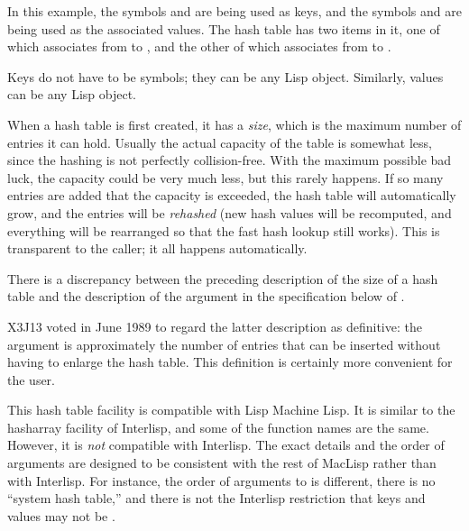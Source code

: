 In this example, the symbols  and  are being used as
keys, and the symbols  and  are being used as the
associated values.  The hash table has two items in it, one of which
associates from  to , and the other of which
associates from  to .

Keys do not have to be symbols; they can be any Lisp object.  Similarly,
values can be any Lisp object.

\begin{obsolete}
When a hash table is first created, it has a {\it size}, which is the
maximum number of entries it can hold.  Usually the actual capacity of
the table is somewhat less, since the hashing is not perfectly
collision-free.  With the maximum possible bad luck, the capacity could
be very much less, but this rarely happens.  If so many entries are
added that the capacity is exceeded, the hash table will automatically
grow, and the entries will be {\it rehashed} (new hash values will be
recomputed, and everything will be rearranged so that the fast hash
lookup still works).  This is transparent to the caller; it all happens
automatically.
\end{obsolete}

\begin{newer}
There is a discrepancy between the preceding description of the
size of a hash table and the description of the  argument
in the specification below
of .

X3J13 voted in June 1989  to regard the
latter description as definitive: the  argument
is approximately the number of entries that can be inserted
without having to enlarge the hash table.  This definition is certainly
more convenient for the user.
\end{newer}

\beforenoterule
\begin{incompatibility}
This hash table facility is compatible with Lisp Machine Lisp.  It
is similar to the hasharray facility of Interlisp, and some of the
function names are the same.  However, it is {\it not} compatible with
Interlisp.  The exact details and the order of arguments are designed to
be consistent with the rest of MacLisp rather than with
Interlisp.  For instance, the order of arguments to  is
different, there is no ``system hash table,'' and there is not
the Interlisp restriction that keys and values may not be {\false}.
\end{incompatibility}
\afternoterule

